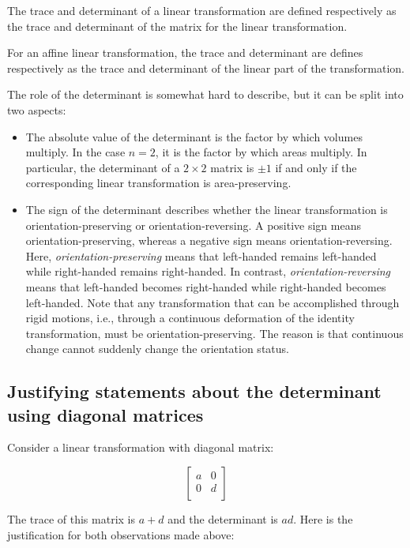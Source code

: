 \documentclass[10pt]{amsart}
\begin{document}
The trace and determinant of a linear transformation are defined
respectively as the trace and determinant of the matrix for the linear
transformation.

For an affine linear transformation, the trace and determinant are
defines respectively as the trace and determinant of the linear part
of the transformation.

The role of the determinant is somewhat hard to describe, but it can
be split into two aspects:

\begin{itemize}
\item The absolute value of the determinant is the factor by which
  volumes multiply. In the case $n = 2$, it is the factor by which
  areas multiply. In particular, the determinant of a $2 \times 2$
  matrix is $\pm 1$ if and only if the corresponding linear
  transformation is area-preserving.
\item The sign of the determinant describes whether the linear
  transformation is orientation-preserving or orientation-reversing. A
  positive sign means orientation-preserving, whereas a negative sign
  means orientation-reversing. Here, {\em orientation-preserving}
  means that left-handed remains left-handed while right-handed
  remains right-handed. In contrast, {\em orientation-reversing} means
  that left-handed becomes right-handed while right-handed becomes
  left-handed. Note that any transformation that can be accomplished
  through rigid motions, i.e., through a continuous deformation of the
  identity transformation, must be orientation-preserving. The reason
  is that continuous change cannot suddenly change the orientation
  status.
\end{itemize}

\subsection{Justifying statements about the determinant using diagonal matrices}

Consider a linear transformation with diagonal matrix:

$$\left[\begin{matrix} a & 0 \\ 0 & d \\\end{matrix}\right]$$

The trace of this matrix is $a + d$ and the determinant is $ad$. Here
is the justification for both observations made above:
\end{document}
